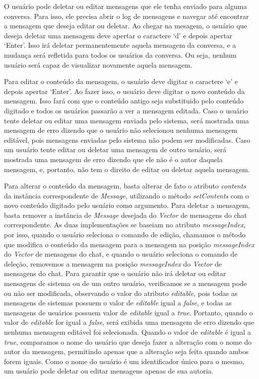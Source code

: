\documentclass[../main.tex]{subfiles}
\begin{document}
O usuário pode deletar ou editar mensagens que ele tenha enviado para alguma conversa.
Para isso, ele precisa abrir o log de mensagens e navegar até encontrar a mensagem que deseja editar ou deletar.
Ao chegar na mesagem, o usuário que deseja deletar uma mensagem deve apertar o caractere `d' e depois apertar `Enter'.
Isso irá deletar permanentemente aquela mensagem da conversa, e a mudança será refletida para todos os usuários da conversa.
Ou seja, nenhum usuário será capaz de visualizar novamente aquela mensagem.

Para editar o conteúdo da mensagem, o usuário deve digitar o caractere `e' e depois apertar `Enter'.
Ao fazer isso, o usuário deve digitar o novo conteúdo da mensagem.
Isso fará com que o conteúdo antigo seja substituido pelo conteúdo digitado e todos os usuários passarão a ver a mensagem editada.
Caso o usuário tente deletar ou editar uma mensagem enviada pelo sistema, será mostrada uma mensagem de erro dizendo que o usuário não selecionou nenhuma mensagem editável, pois mensagens enviadas pelo sistema não podem ser modificadas.
Caso um usuário tente editar ou deletar uma mensagem de outro usuário, será mostrada uma mensagem de erro dizendo que ele não é o autor daquela mensagem, e, portanto, não tem o direito de editar ou deletar aquela mensagem.

Para alterar o conteúdo da mensagem, basta alterar de fato o atributo \textit{contents} da instância correspondente de \textit{Message}, utilizando o método \textit{setContents} com o novo conteúdo digitado pelo usuário como argumento.
Para deletar a mensagem, basta remover a instância de \textit{Message} desejada do \textit{Vector} de mensagens do chat correspondente.
As duas implementações se baseiam no atributo \textit{messageIndex}, por isso, quando o usuário seleciona o comando de edição, chamamos o método que modifica o conteúdo da mensagem para a mensagem na posição \textit{messageIndex} do \textit{Vector} de mensagens do chat, e quando o usuário seleciona o comando de deleção, removemos a mensagem na posição \textit{messageIndex} do \textit{Vector} de mensagens do chat.
Para garantir que o usuário não irá deletar ou editar mensagens de sistema ou de um outro usuário, verificamos se a mensagem pode ou não ser modificada, observando o valor do atributo \textit{editable}, pois todas as mensagens de sistemas possuem o valor de \textit{editable} igual a \textit{false}, e todas as mensagens de usuários possuem valor de \textit{editable} igual a \textit{true}.
Portanto, quando o valor de \textit{editable} for igual a \textit{false}, será exibida uma mensagem de erro dizendo que nenhuma mensagem editável foi selecionada.
Quando o valor de \textit{editable} é igual a \textit{true}, comparamos o nome do usuário que deseja fazer a alteração com o nome do autor da mensagem, permitindo apenas que a alteração seja feita quando ambos forem iguais.
Como o nome do usuário é um identificador único para o mesmo, um usuário pode deletar ou editar mensagens apenas de sua autoria.
\end{document}
